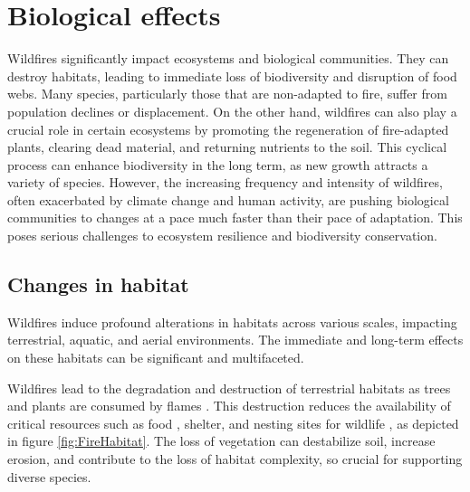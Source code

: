\documentclass[
  12 pt,
]{Nemilov}
\begin{document}
\section{Biological effects}\label{biological-effects}

Wildfires significantly impact ecosystems and biological communities. They can destroy habitats, leading to immediate loss of biodiversity and disruption of food webs. Many species, particularly those that are non-adapted to fire, suffer from population declines or displacement. On the other hand, wildfires can also play a crucial role in certain ecosystems by promoting the regeneration of fire-adapted plants, clearing dead material, and returning nutrients to the soil. This cyclical process can enhance biodiversity in the long term, as new growth attracts a variety of species. However, the increasing frequency and intensity of wildfires, often exacerbated by climate change and human activity, are pushing biological communities to changes at a pace much faster than their pace of adaptation. This poses serious challenges to ecosystem resilience and biodiversity conservation.

\subsection{Changes in habitat}\label{changes-in-habitat}

Wildfires induce profound alterations in habitats across various scales, impacting terrestrial, aquatic, and aerial environments. The immediate and long-term effects on these habitats can be significant and multifaceted.

Wildfires lead to the degradation and destruction of terrestrial habitats as trees and plants are consumed by flames \citep{bosso2018loss, mcgarigal2005quantifying}. This destruction reduces the availability of critical resources such as food \citep{apfelbaum1981bird, nkwabi2011disturbance}, shelter, and nesting sites for wildlife \citep{Brooker1991ImpactOW, Peterson2023SnagDF, Stillman2019NestSS}, as depicted in figure \ref{fig:FireHabitat}. The loss of vegetation can destabilize soil, increase erosion, and contribute to the loss of habitat complexity, so crucial for supporting diverse species.
\end{document}

